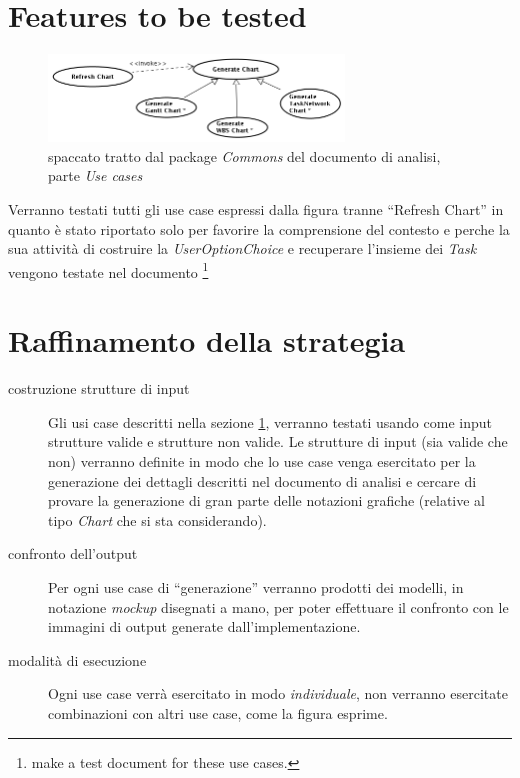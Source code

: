 \section{Features to be tested}
\label{sec:GenerateChart}
\begin{figure}[h!] 
\centering 
\includegraphics[width=0.7\textwidth]{desing_spec/GenerateChart.png}
\caption{spaccato tratto dal package \emph{Commons} del documento di analisi,
parte \emph{Use cases}}

\end{figure}
Verranno testati tutti gli use case espressi dalla figura tranne ``Refresh
Chart'' in quanto \`e stato riportato solo per favorire la comprensione del
contesto e perche la sua attivit\`a di costruire la \emph{UserOptionChoice} e
recuperare l'insieme dei \emph{Task} vengono testate nel documento
\footnote{make a test document for these use cases.}

\section{Raffinamento della strategia}
\begin{description}
  \item[costruzione strutture di input] Gli usi case descritti nella sezione 
\ref{sec:GenerateChart}, verranno testati usando come input strutture valide e
strutture non valide. Le strutture di input (sia valide che non) verranno
definite in modo che lo use case venga esercitato per la generazione dei
dettagli descritti nel documento di analisi e cercare di provare la generazione
di gran parte delle notazioni grafiche (relative al tipo \emph{Chart} che si
sta considerando).
  \item[confronto dell'output] Per ogni use case di ``generazione'' verranno 
  prodotti dei modelli, in notazione \emph{mockup} disegnati a mano, per poter 
  effettuare il confronto con le immagini di output generate
  dall'implementazione.
  \item[modalit\`a di esecuzione] Ogni use case verr\`a esercitato in modo 
  \emph{individuale}, non verranno esercitate combinazioni con altri use case,
  come la figura esprime.
\end{description}

